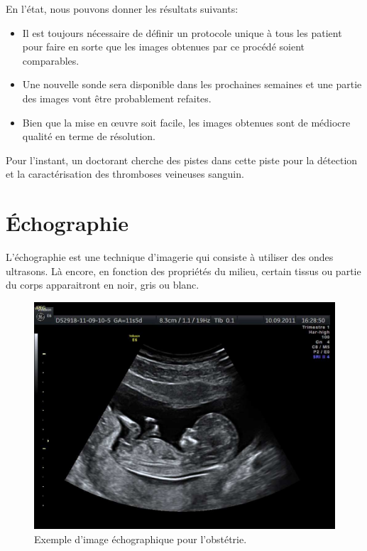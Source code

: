 En l'état, nous pouvons donner les résultats suivants:

\begin{itemize}
\item Il est toujours nécessaire de définir un protocole unique à tous les patient pour faire en sorte que les images obtenues par ce procédé soient comparables.
\item Une nouvelle sonde sera disponible dans les prochaines semaines et une partie des images vont être probablement refaites.
\item Bien que la mise en œuvre soit facile, les images obtenues sont de médiocre qualité en terme de résolution.
\end{itemize}

Pour l'instant, un doctorant cherche des pistes dans cette piste pour la détection et la caractérisation des thromboses veineuses sanguin.
 
\section{Échographie}

L'échographie est une technique d'imagerie qui consiste à utiliser des ondes ultrasons. Là encore, en fonction des propriétés du milieu, certain tissus ou partie du corps apparaitront en noir, gris ou blanc. 

\begin{figure}[H]
\centering
    \includegraphics[scale=0.6,angle=0]{Images/Echographie-profil.jpg}
    \caption{Exemple d'image échographique pour l'obstétrie.}
    \label{fig:Echographie}
\end{figure}


